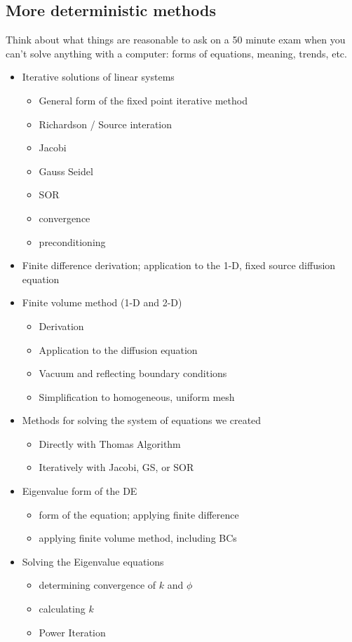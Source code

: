 \documentclass[12pt]{article}
\begin{document}
\subsection*{More deterministic methods}
Think about what things are reasonable to ask on a 50 minute exam when you can't solve anything with a computer: forms of equations, meaning, trends, etc.
\begin{itemize}
\item Iterative solutions of linear systems
  \begin{itemize}
  \item General form of the fixed point iterative method
  \item Richardson / Source interation
  \item Jacobi
  \item Gauss Seidel
  \item SOR
  \item convergence
  \item preconditioning
  \end{itemize}


\item Finite difference derivation; application to the 1-D, fixed source diffusion equation
\item Finite volume method (1-D and 2-D)
  \begin{itemize}
  \item Derivation
  \item Application to the diffusion equation
  \item Vacuum and reflecting boundary conditions
  \item Simplification to homogeneous, uniform mesh
  \end{itemize}
  
\item Methods for solving the system of equations we created
  \begin{itemize}
  \item Directly with Thomas Algorithm
  \item Iteratively with Jacobi, GS, or SOR
  \end{itemize}

\item Eigenvalue form of the DE
  \begin{itemize}
  \item form of the equation; applying finite difference
  \item applying finite volume method, including BCs
  \end{itemize}
  
\item Solving the Eigenvalue equations
  \begin{itemize}
  \item determining convergence of $k$ and $\phi$
  \item calculating $k$
  \item Power Iteration
  \end{itemize}
\end{itemize}
\end{document}
